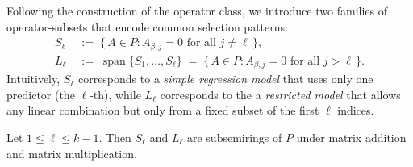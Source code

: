 \begin{defn}
Following the construction of the operator class, we introduce two families of operator-subsets that encode common selection patterns:
\[
\begin{aligned}
S_\ell &\;:=\; \{\, A\in P : A_{\beta,j}=0 \text{ for all } j\neq \ell \,\}, \\[3pt]
L_\ell &\;:=\; \operatorname{span}\{ S_1,\dots,S_\ell\}
      \;=\; \{\, A\in P : A_{\beta,j}=0 \text{ for all } j>\ell \,\}.
\end{aligned}
\]
Intuitively, \(S_\ell\) corresponds to a \emph{simple regression model} that uses only one predictor (the $\ell$-th), while \(L_\ell\) corresponds to the a \emph{restricted model} that allows any linear combination but only from a fixed subset of the first \(\ell\) indices.
\end{defn}

\begin{prop}
Let $1 \le \ell \le k-1$. Then $S_\ell$ and $L_\ell$ are subsemirings of $P$ under matrix addition and matrix multiplication.
\end{prop}

%
%
%

